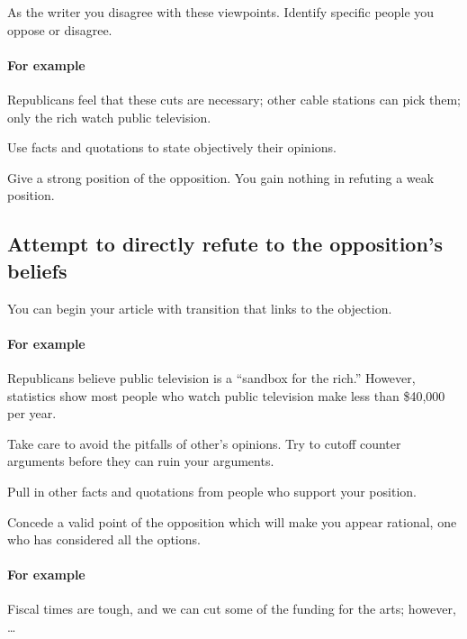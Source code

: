 \documentclass{tufte-handout}\usepackage[]{graphicx}\usepackage[]{color}
\newenvironment{itemize*}%
  {\begin{itemize}%
    \setlength{\itemsep}{0pt}%
    \setlength{\parskip}{0pt}}%
  {\end{itemize}}
\begin{document}
As the writer you disagree with these viewpoints. Identify specific people you oppose or disagree. 

\paragraph{For example} Republicans feel that these cuts are necessary; other cable stations can pick them; only the rich watch public television.

\begin{itemize*}
	\item Use facts and quotations to state objectively their opinions.

	\item Give a strong position of the opposition. You gain nothing in refuting a weak position.
\end{itemize*}
 
\subsection{Attempt to directly refute to the opposition's beliefs}

\begin{itemize*}
\item You can begin your article with transition that links to the objection.

\paragraph{For example} Republicans believe public television is a ``sandbox for the rich.'' However, statistics show most people who watch public television make less than \$40,000 per year.

\begin{marginfigure}
	\caption{Take care to avoid the pitfalls of other's opinions. Try to cutoff counter arguments before they can ruin your arguments.}
	\label{fig:Divestment-600-AEA-1}
\end{marginfigure}


	\item Pull in other facts and quotations from people who support your position.
	\item Concede a valid point of the opposition which will make you appear rational, one who has considered all the options.
	
\paragraph{For example} Fiscal times are tough, and we can cut some of the funding for the arts; however, \ldots
\end{itemize*}
\end{document}
